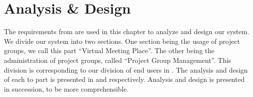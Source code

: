 \chapter{Analysis \& Design}
%
\label{chap:analysis}%
\label{chap:design}%
\label{chap:analdesign}%
The requirements from  are used in this chapter to analyze and design our system.
We divide our system into two sections.
One section being the usage of project groups, we call this part ``Virtual Meeting Place''.
The other being the administration of project groups, called ``Project Group Management''.
This division is corresponding to our division of end users in .
The analysis and design of each to part is presented in  and  respectively.
Analysis and design is presented in succession, to be more comprehensible. 






